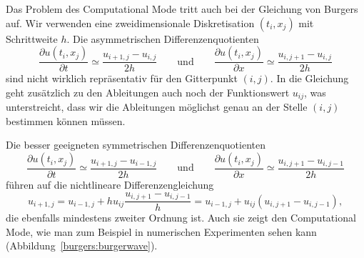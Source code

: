 Das Problem des Computational Mode tritt auch bei der Gleichung von Burgers
auf.
Wir verwenden eine zweidimensionale Diskretisation $(t_i, x_j)$ mit
Schrittweite $h$.
Die asymmetrischen Differenzenquotienten
\[
\frac{\partial u(t_i,x_j)}{\partial t}
\simeq
\frac{u_{i+1,j} - u_{i,j}}{2h}
\qquad\text{und}\qquad
\frac{\partial u(t_i, x_j)}{\partial x}
\simeq
\frac{u_{i,j+1} - u_{i,j}}{2h}
\]
sind nicht wirklich repräsentativ für den Gitterpunkt $(i,j)$.
In die Gleichung geht zusätzlich zu den Ableitungen auch noch der
Funktionswert $u_{ij}$, was unterstreicht, dass wir die Ableitungen
möglichst genau an der Stelle $(i,j)$ bestimmen können müssen.

Die besser geeigneten symmetrischen Differenzenquotienten 
\[
\frac{\partial u(t_i,x_j)}{\partial t}
\simeq
\frac{u_{i+1,j} - u_{i-1,j}}{2h}
\qquad\text{und}\qquad
\frac{\partial u(t_i, x_j)}{\partial x}
\simeq
\frac{u_{i,j+1} - u_{i,j-1}}{2h}
\]
führen auf die nichtlineare Differenzengleichung
\begin{equation}
u_{i+1,j}
= 
u_{i-1,j}
+
h
u_{ij}\frac{u_{i,j+1}-u_{i,j-1}}{h}
=
u_{i-1,j}
+
u_{ij}(u_{i,j+1}-u_{i,j-1}),
\label{burgers:diffgleichung}
\end{equation}
die ebenfalls mindestens zweiter Ordnung ist.
Auch sie zeigt den Computational Mode, wie man zum Beispiel 
in numerischen Experimenten sehen kann (Abbildung~\ref{burgers:burgerwave}).





